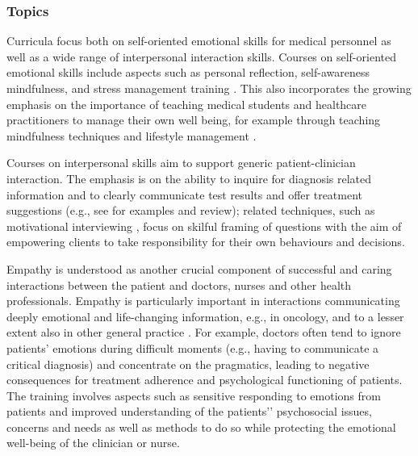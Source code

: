 \documentclass[prodmode,acmtochi]{acmsmall}
\newcommand{\todo}[1]{\textrm{\textrm{\textcolor{LightBlue}{[[#1]]} } } }
\newcommand{\GeraldineFIX}[1]{}
\newcommand{\GeraldineTODO}[1]{}
\begin{document}
\subsubsection*{Topics} 
Curricula focus both on self-oriented emotional skills for medical personnel as well as a wide range of interpersonal interaction skills. 
%
Courses on self-oriented emotional skills include aspects such as personal reflection, self-awareness mindfulness, and stress management training \cite{Shapiro2000,Epstein1999,Satterfield2007}. This also incorporates the growing emphasis on the importance of teaching medical students and healthcare practitioners to manage their own well being, for example through teaching mindfulness techniques and lifestyle management \cite{Hassed2009}.
\GeraldineTODO{G: add in sentence or two (maybe as above?)about self-care courses eg the mindfulness courses at Monash eg Hassed et al 2009 - ref in comment)}

        Courses on interpersonal skills aim to support generic patient-clinician interaction. The emphasis is on the ability to inquire for diagnosis related information and to clearly communicate test results and offer  treatment suggestions (e.g., see \cite{Kalet2004,Barth2011} for examples and review); related techniques, such as  motivational interviewing \cite{Hettema2005},  focus on skilful framing of questions with the aim of empowering  clients to take responsibility for their own behaviours and decisions.  
%
        
Empathy is understood as another crucial component of successful and caring interactions between the patient and doctors, nurses and other health professionals. Empathy is particularly important in interactions communicating deeply emotional and life-changing information, e.g., in oncology, and to a lesser extent also in other general practice \cite{Barth2011}.
                For example, doctors often tend to ignore patients' emotions during difficult moments (e.g., having to communicate a critical diagnosis) and concentrate on the pragmatics, leading to negative consequences for treatment adherence and psychological functioning of patients. The training involves aspects such as sensitive responding to emotions from patients and improved understanding of the patients'’ psychosocial issues, concerns and needs as well as methods to do so while protecting the emotional well-being of the clinician or nurse. 


\GeraldineFIX{ G: say what technology how used in a sentence???}
\GeraldineFIX{ G: this doesn't seem to be empathy but about self awareness/regulation?  ... P: Is this a bit better? 
I'm drawing on the reviews and the concerns they use in this space -- in my reading it is also around objectification of the patient etc... where regulation is obviously important, but also as a part of being able to emphasise in these cases without burn-out etc. .. I think it might be too complex to go into details here (especially given what a tangled mess empathy as a concept is :)}
\end{document}
